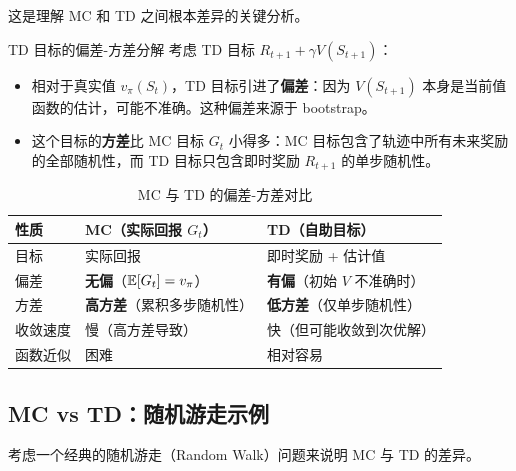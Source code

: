 这是理解 MC 和 TD 之间根本差异的关键分析。

\begin{mydefinition}{TD 目标的偏差-方差分解}
考虑 TD 目标 $R_{t+1} + \gamma V(S_{t+1})$：
\begin{itemize}
    \item 相对于真实值 $v_{\pi}(S_t)$，TD 目标引进了\textbf{偏差}：因为 $V(S_{t+1})$ 本身是当前值函数的估计，可能不准确。这种偏差来源于 bootstrap。
    \item 这个目标的\textbf{方差}比 MC 目标 $G_t$ 小得多：MC 目标包含了轨迹中所有未来奖励的全部随机性，而 TD 目标只包含即时奖励 $R_{t+1}$ 的单步随机性。
\end{itemize}
\end{mydefinition}

\begin{table}[H]
\centering
\caption{MC 与 TD 的偏差-方差对比}
\begin{tabular}{@{}p{3cm}p{4cm}p{4cm}@{}}
\toprule
性质 & MC（实际回报 $G_t$） & TD（自助目标） \\
\midrule
目标 & 实际回报 & 即时奖励 + 估计值 \\
偏差 & \textbf{无偏}（$\mathbb{E}[G_t] = v_{\pi}$） & \textbf{有偏}（初始 $V$ 不准确时） \\
方差 & \textbf{高方差}（累积多步随机性） & \textbf{低方差}（仅单步随机性） \\
收敛速度 & 慢（高方差导致） & 快（但可能收敛到次优解） \\
函数近似 & 困难 & 相对容易 \\
\bottomrule
\end{tabular}
\end{table}

\subsection{MC vs TD：随机游走示例}

考虑一个经典的随机游走（Random Walk）问题来说明 MC 与 TD 的差异。

